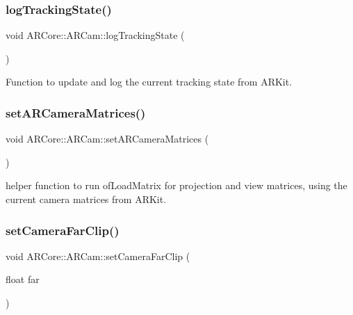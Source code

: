 \subsubsection{\texorpdfstring{log\+Tracking\+State()}{logTrackingState()}}
{\footnotesize\ttfamily void A\+R\+Core\+::\+A\+R\+Cam\+::log\+Tracking\+State (\begin{DoxyParamCaption}{ }\end{DoxyParamCaption})}



Function to update and log the current tracking state from A\+R\+Kit. 

\mbox{\label{class_a_r_core_1_1_a_r_cam_ac554b8254ea4a22f122f25542694dafa}} 
\subsubsection{\texorpdfstring{set\+A\+R\+Camera\+Matrices()}{setARCameraMatrices()}}
{\footnotesize\ttfamily void A\+R\+Core\+::\+A\+R\+Cam\+::set\+A\+R\+Camera\+Matrices (\begin{DoxyParamCaption}{ }\end{DoxyParamCaption})}

helper function to run of\+Load\+Matrix for projection and view matrices, using the current camera matrices from A\+R\+Kit. \mbox{\label{class_a_r_core_1_1_a_r_cam_aa29191b58c0e6613850916526c6ab380}} 
\subsubsection{\texorpdfstring{set\+Camera\+Far\+Clip()}{setCameraFarClip()}}
{\footnotesize\ttfamily void A\+R\+Core\+::\+A\+R\+Cam\+::set\+Camera\+Far\+Clip (\begin{DoxyParamCaption}\item[{float}]{far }\end{DoxyParamCaption})}



